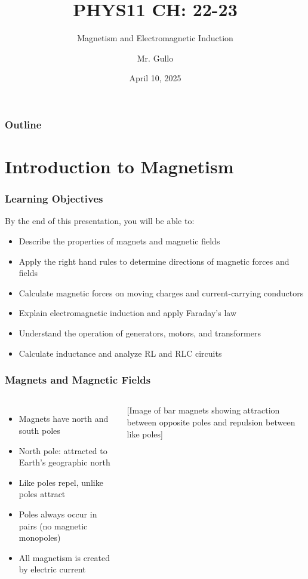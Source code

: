 \documentclass{beamer}
\title[Magnetism \& EM Induction]{PHYS11 CH: 22-23}
\subtitle{Magnetism and Electromagnetic Induction}
\author[Mr. Gullo]{Mr. Gullo}
\date[April 2025]{April 10, 2025}
\institute[Physics]{PHYS11 - College Physics}
\begin{document}
\frame{\titlepage}

\begin{frame}
\frametitle{Outline}
\tableofcontents
\end{frame}

\section{Introduction to Magnetism}

\begin{frame}
\frametitle{Learning Objectives}
\begin{block}{By the end of this presentation, you will be able to:}
\begin{itemize}
    \item Describe the properties of magnets and magnetic fields
    \item Apply the right hand rules to determine directions of magnetic forces and fields
    \item Calculate magnetic forces on moving charges and current-carrying conductors
    \item Explain electromagnetic induction and apply Faraday's law
    \item Understand the operation of generators, motors, and transformers
    \item Calculate inductance and analyze RL and RLC circuits
\end{itemize}
\end{block}
\end{frame}

\begin{frame}
\frametitle{Magnets and Magnetic Fields}
\begin{columns}
\begin{itemize}
    \item Magnets have north and south poles
    \item North pole: attracted to Earth's geographic north
    \item Like poles repel, unlike poles attract
    \item Poles always occur in pairs (no magnetic monopoles)
    \item All magnetism is created by electric current
\end{itemize}
\alert{[Image of bar magnets showing attraction between opposite poles and repulsion between like poles]}
\end{columns}
\end{frame}
\end{document}
